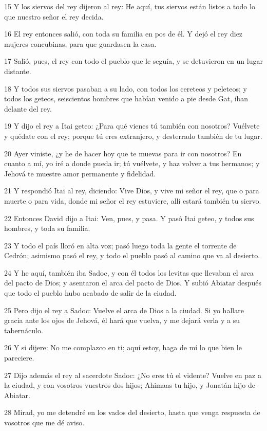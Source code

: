 \par 15 Y los siervos del rey dijeron al rey: He aquí, tus siervos están listos a todo lo que nuestro señor el rey decida.
\par 16 El rey entonces salió, con toda su familia en pos de él. Y dejó el rey diez mujeres concubinas, para que guardasen la casa.
\par 17 Salió, pues, el rey con todo el pueblo que le seguía, y se detuvieron en un lugar distante.
\par 18 Y todos sus siervos pasaban a su lado, con todos los cereteos y peleteos; y todos los geteos, seiscientos hombres que habían venido a pie desde Gat, iban delante del rey.
\par 19 Y dijo el rey a Itai geteo: ¿Para qué vienes tú también con nosotros? Vuélvete y quédate con el rey; porque tú eres extranjero, y desterrado también de tu lugar.
\par 20 Ayer viniste, ¿y he de hacer hoy que te muevas para ir con nosotros? En cuanto a mí, yo iré a donde pueda ir; tú vuélvete, y haz volver a tus hermanos; y Jehová te muestre amor permanente y fidelidad.
\par 21 Y respondió Itai al rey, diciendo: Vive Dios, y vive mi señor el rey, que o para muerte o para vida, donde mi señor el rey estuviere, allí estará también tu siervo.
\par 22 Entonces David dijo a Itai: Ven, pues, y pasa. Y pasó Itai geteo, y todos sus hombres, y toda su familia.
\par 23 Y todo el país lloró en alta voz; pasó luego toda la gente el torrente de Cedrón; asimismo pasó el rey, y todo el pueblo pasó al camino que va al desierto.
\par 24 Y he aquí, también iba Sadoc, y con él todos los levitas que llevaban el arca del pacto de Dios; y asentaron el arca del pacto de Dios. Y subió Abiatar después que todo el pueblo hubo acabado de salir de la ciudad.
\par 25 Pero dijo el rey a Sadoc: Vuelve el arca de Dios a la ciudad. Si yo hallare gracia ante los ojos de Jehová, él hará que vuelva, y me dejará verla y a su tabernáculo.
\par 26 Y si dijere: No me complazco en ti; aquí estoy, haga de mí lo que bien le pareciere.
\par 27 Dijo además el rey al sacerdote Sadoc: ¿No eres tú el vidente? Vuelve en paz a la ciudad, y con vosotros vuestros dos hijos; Ahimaas tu hijo, y Jonatán hijo de Abiatar.
\par 28 Mirad, yo me detendré en los vados del desierto, hasta que venga respuesta de vosotros que me dé aviso.
